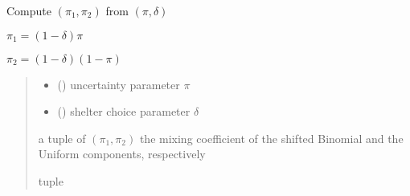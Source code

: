\documentclass[letterpaper,10pt,english]{sphinxmanual}
\begin{document}

\begin{fulllineitems}
\label{\detokenize{cubmods:cubmods.cubsh.pidelta_to_pi1pi2}}
\pysigstartsignatures
{}
\pysigstopsignatures
\sphinxAtStartPar
Compute \((\pi_1, \pi_2)\) from \((\pi, \delta)\)

\sphinxAtStartPar
\(\pi_1 = (1 - \delta) \pi\)

\sphinxAtStartPar
\(\pi_2 = (1 - \delta)(1 - \pi)\)
\begin{quote}\begin{description}
\begin{itemize}
\item {} 
\sphinxAtStartPar
{} () \textendash{} uncertainty parameter \(\pi\)

\item {} 
\sphinxAtStartPar
{} () \textendash{} shelter choice parameter \(\delta\)

\end{itemize}

\sphinxAtStartPar
a tuple of \((\pi_1, \pi_2)\) the mixing coefficient of the shifted
Binomial and the Uniform components, respectively

\sphinxAtStartPar
tuple

\end{description}\end{quote}

\end{fulllineitems}

\end{document}
